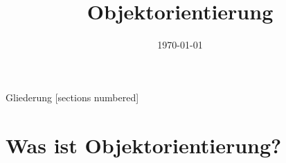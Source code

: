 



\title{Objektorientierung}
\date{\today}




\maketitle

\begin{frame}{Gliederung}
    [sections numbered]
    \tableofcontents
\end{frame}

\section{Was ist \glqq Objektorientierung\grqq?}

